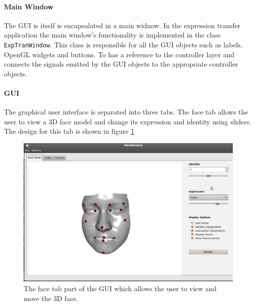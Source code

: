 \documentclass[11pt,a4paper]{report}
\begin{document}
\paragraph{Main Window}
The GUI is itself is encapsulated in a main widnow. In the expression transfer application the
main window's functionality is implemented in the class
\texttt{ExpTranWindow}. This class is responsible for all the GUI objects such
as labels, OpenGL widgets and buttons. To has a reference to the controller
layer and connects the signals emitted by the GUI objects to the appropriate
controller objects.
\paragraph{GUI}
The graphical user interface is separated into three tabs. The face tab allows
the user to view a 3D face model and change its expression and identity using
sliders. The design for this tab is shown in figure \ref{fg:facetab}

\begin{figure}[h]
\begin{centering}
\includegraphics[scale=0.35]{images/facetab.png}
\par\end{centering}

\caption{The face tab part of the GUI which allows the user to view and move the
  3D face.}
\label{fg:facetab}
\end{figure}
\end{document}
